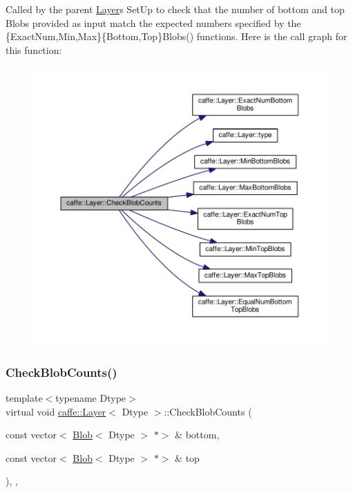 Called by the parent \mbox{\hyperlink{classcaffe_1_1_layer}{Layer}}\textquotesingle{}s Set\+Up to check that the number of bottom and top Blobs provided as input match the expected numbers specified by the \{Exact\+Num,Min,Max\}\{Bottom,Top\}Blobs() functions. Here is the call graph for this function\+:
\nopagebreak
\begin{figure}[H]
\begin{center}
\leavevmode
\includegraphics[width=350pt]{classcaffe_1_1_layer_a55c8036130225fbc874a986bdf4b27e2_cgraph}
\end{center}
\end{figure}
\mbox{\label{classcaffe_1_1_layer_a55c8036130225fbc874a986bdf4b27e2}} 
\subsubsection{\texorpdfstring{Check\+Blob\+Counts()}{CheckBlobCounts()}\hspace{0.1cm}{\footnotesize\ttfamily [2/2]}}
{\footnotesize\ttfamily template$<$typename Dtype$>$ \\
virtual void \mbox{\hyperlink{classcaffe_1_1_layer}{caffe\+::\+Layer}}$<$ Dtype $>$\+::Check\+Blob\+Counts (\begin{DoxyParamCaption}\item[{const vector$<$ \mbox{\hyperlink{classcaffe_1_1_blob}{Blob}}$<$ Dtype $>$ $\ast$$>$ \&}]{bottom,  }\item[{const vector$<$ \mbox{\hyperlink{classcaffe_1_1_blob}{Blob}}$<$ Dtype $>$ $\ast$$>$ \&}]{top }\end{DoxyParamCaption})\hspace{0.3cm}{\ttfamily [inline]}, {\ttfamily [protected]}, {\ttfamily [virtual]}}

